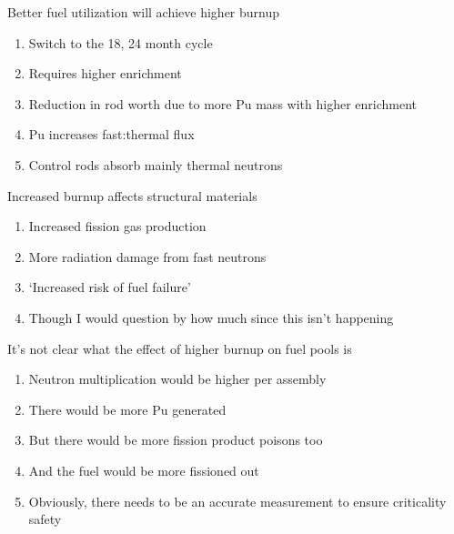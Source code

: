 \documentclass[aspectratio=1610,pdftex,dvipsnames,compress,xcolor={dvipsnames}]{beamer}
\begin{document}
\addtocounter{framenumber}{-1} 
\begin{frame}{Better fuel utilization will achieve higher burnup}
    \begin{enumerate}[series=blue,topsep=0pt,itemsep=21pt,leftmargin=*,label=(\arabic*)]
        \item[]Switch to the 18, 24 month cycle
        \item[]Requires higher enrichment
        \item[]Reduction in rod worth due to more Pu mass with higher enrichment
        \item[]Pu increases fast:thermal flux
        \item[]Control rods absorb mainly thermal neutrons
    \end{enumerate}
\end{frame}


\begin{frame}{Increased burnup affects structural materials}
    \begin{enumerate}[resume=blue,topsep=0pt,itemsep=21pt,leftmargin=*,label=(\arabic*)]
        \item[]Increased fission gas production
        \item[]More radiation damage from fast neutrons
        \item[]`Increased risk of fuel failure'
        \item[]Though I would question by how much since this isn't happening
    \end{enumerate}
\end{frame}


\begin{frame}{It's not clear what the effect of higher burnup on fuel pools is}
    \begin{enumerate}[series=outerlist,topsep=0pt,itemsep=21pt,leftmargin=*,label=(\arabic*)]
        \item[]Neutron multiplication would be higher per assembly
        \item[]There would be more Pu generated
        \item[]But there would be more fission product poisons too
        \item[]And the fuel would be more fissioned out
        \item[]Obviously, there needs to be an accurate measurement to ensure criticality safety
    \end{enumerate}
\end{frame}
\end{document}
